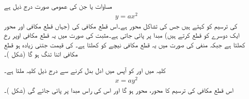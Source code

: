 مساوات  یا  جن کی عمومی صورت درج ذیل ہے
\begin{align*}
y=ax^2
\end{align*}
 کی ترسیم کو  کہتے ہیں جس کی  تشاکل  محور ہے۔اس قطع مکافی کی  (جہاں قطع مکافی اور محور ایک دوسرے کو قطع کرتے ہیں) مبدا پر پائی جاتی ہے۔مثبت   کی صورت میں یہ قطع مکافی اوپر رخ کھلتا ہے جبکہ منفی   کی صورت میں  یہ قطع مکافی نیچے کو کھلتا ہے۔  کی قیمت جتنی زیادہ ہو قطع مکافی اتنا تنگ ہو گا (شکل )۔ 

کلیہ  میں  اور  کو  آپس میں ادل بدل کرنے  سے درج ذیل کلیہ ملتا ہے۔
\begin{align*}
x=ay^2
\end{align*}
اس قطع مکافی  کی ترسیم کا محور،  محور ہو گا اور اس کی راس مبدا پر پائی جائے گی  (شکل )۔
